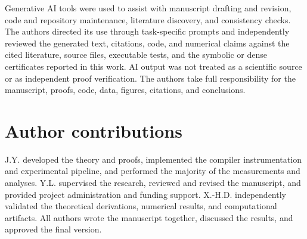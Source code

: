 \documentclass[a4paper,twocolumn,10pt,unpublished]{quantumarticle}
\begin{document}
\begin{acknowledgements}
\begingroup
{}
Generative AI tools were used to assist with manuscript drafting and
revision, code and repository maintenance, literature discovery, and
consistency checks.  The authors directed its use through task-specific
prompts and independently reviewed the generated text, citations, code, and
numerical claims against the cited literature, source files, executable tests,
and the symbolic or dense certificates reported in this work.  AI output was
not treated as a scientific source or as independent proof verification.  The
authors take full responsibility for the manuscript, proofs, code, data,
figures, citations, and conclusions.\par
\endgroup
\end{acknowledgements}

\section*{Author contributions}

J.Y. developed the theory and proofs, implemented the compiler instrumentation
and experimental pipeline, and performed the majority of the measurements and
analyses.  Y.L. supervised the research, reviewed and revised the manuscript,
and provided project administration and funding support.  X.-H.D.
independently validated the theoretical derivations, numerical results, and
computational artifacts.  All authors wrote the manuscript together,
discussed the results, and approved the final version.






\appendix



\end{document}
